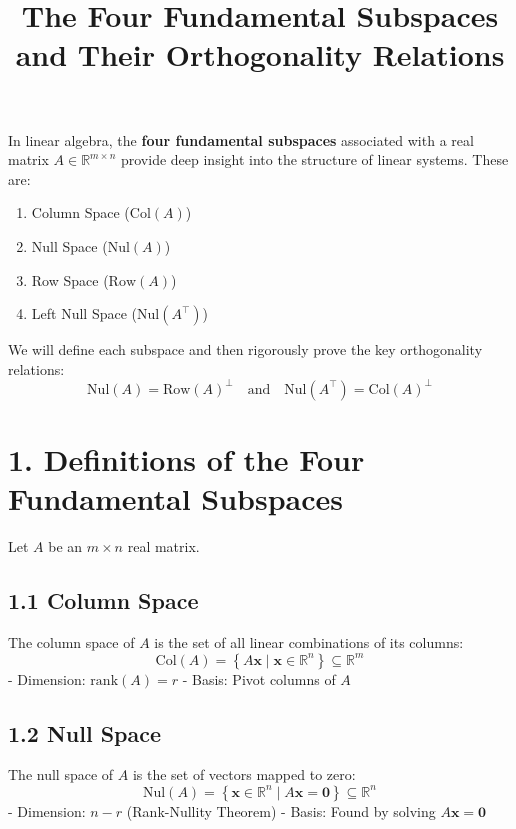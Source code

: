 \documentclass[11pt]{article}
\title{The Four Fundamental Subspaces and Their Orthogonality Relations}
\author{}
\date{}
\begin{document}
\maketitle

\Large

In linear algebra, the \textbf{four fundamental subspaces} associated with a real matrix \( A \in \mathbb{R}^{m \times n} \) provide deep insight into the structure of linear systems. These are:
\begin{enumerate}[label=\arabic*.]
    \item Column Space (\( \mathrm{Col}(A) \))
    \item Null Space (\( \mathrm{Nul}(A) \))
    \item Row Space (\( \mathrm{Row}(A) \))
    \item Left Null Space (\( \mathrm{Nul}(A^\top) \))
\end{enumerate}

We will define each subspace and then rigorously prove the key orthogonality relations:
\[
\boxed{\mathrm{Nul}(A) = \mathrm{Row}(A)^\perp} \quad \text{and} \quad \boxed{\mathrm{Nul}(A^\top) = \mathrm{Col}(A)^\perp}
\]

\section*{1. Definitions of the Four Fundamental Subspaces}

Let \( A \) be an \( m \times n \) real matrix.

\subsection*{1.1 Column Space}
The column space of \( A \) is the set of all linear combinations of its columns:
\[
\mathrm{Col}(A) = \left\{ A\mathbf{x} \mid \mathbf{x} \in \mathbb{R}^n \right\} \subseteq \mathbb{R}^m
\]
- Dimension: \( \mathrm{rank}(A) = r \)
- Basis: Pivot columns of \( A \)

\subsection*{1.2 Null Space}
The null space of \( A \) is the set of vectors mapped to zero:
\[
\mathrm{Nul}(A) = \left\{ \mathbf{x} \in \mathbb{R}^n \mid A\mathbf{x} = \mathbf{0} \right\} \subseteq \mathbb{R}^n
\]
- Dimension: \( n - r \) (Rank-Nullity Theorem)
- Basis: Found by solving \( A\mathbf{x} = \mathbf{0} \)
\end{document}
